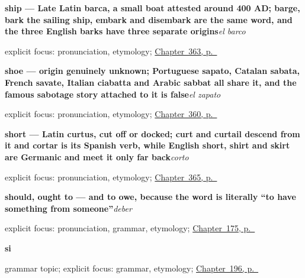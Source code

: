 \noindent\begin{minipage}[t]{\linewidth}
\raggedright
\textbf{ship — Late Latin barca, a small boat attested around 400 AD; barge, bark the sailing ship, embark and disembark are the same word, and the three English barks have three separate origins}\enspace\emph{el barco}\par
\footnotesize explicit focus: pronunciation, etymology; \hyperref[ch:el-coche-y-el-avion]{Chapter~363, p.~\pageref*{ch:el-coche-y-el-avion}}
\end{minipage}\par\smallskip

\noindent\begin{minipage}[t]{\linewidth}
\raggedright
\textbf{shoe — origin genuinely unknown; Portuguese sapato, Catalan sabata, French savate, Italian ciabatta and Arabic sabbat all share it, and the famous sabotage story attached to it is false}\enspace\emph{el zapato}\par
\footnotesize explicit focus: pronunciation, etymology; \hyperref[ch:la-ropa-y-el-zapato]{Chapter~360, p.~\pageref*{ch:la-ropa-y-el-zapato}}
\end{minipage}\par\smallskip

\noindent\begin{minipage}[t]{\linewidth}
\raggedright
\textbf{short — Latin curtus, cut off or docked; curt and curtail descend from it and cortar is its Spanish verb, while English short, shirt and skirt are Germanic and meet it only far back}\enspace\emph{corto}\par
\footnotesize explicit focus: pronunciation, etymology; \hyperref[ch:alto-y-largo]{Chapter~365, p.~\pageref*{ch:alto-y-largo}}
\end{minipage}\par\smallskip

\noindent\begin{minipage}[t]{\linewidth}
\raggedright
\textbf{should, ought to — and to owe, because the word is literally \textquotedblleft{}to have something from someone\textquotedblright{}}\enspace\emph{deber}\par
\footnotesize explicit focus: pronunciation, grammar, etymology; \hyperref[ch:spanish-giving-reasons]{Chapter~175, p.~\pageref*{ch:spanish-giving-reasons}}
\end{minipage}\par\smallskip

\noindent\begin{minipage}[t]{\linewidth}
\raggedright
\textbf{si}\par
\footnotesize grammar topic; explicit focus: grammar, etymology; \hyperref[ch:si]{Chapter~196, p.~\pageref*{ch:si}}
\end{minipage}\par\smallskip

